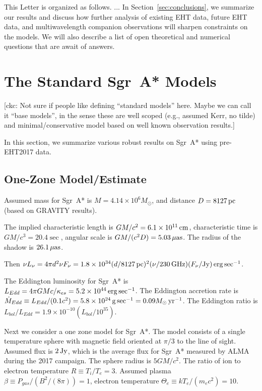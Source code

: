 \documentclass[twocolumn,tighten,dvipsnames]{aastex63}
\newcommand\sgra{Sgr~A*\xspace}
\newcommand\mbh{{M}} %
\newcommand\msun{{M_\odot}}
\newcommand\yr{{\rm \, yr}}
\newcommand\erg{{\rm \, erg}}
\newcommand\Jy{{\rm \, Jy}}
\newcommand\cm{{\rm \, cm}}
\newcommand\pc{{\rm \, pc}}
\newcommand\gm{{\rm \, g}}
\newcommand\uas{{\rm \, \mu as}}
\newcommand\GHz{{\rm \, GHz}}
\newcommand\<{{\langle}}
\renewcommand\>{{\rangle}} %
\newcommand\ckc[1]{{\color{MidnightBlue}[ckc: #1]}}
\begin{document}
This Letter is organized as follows.
...
In Section~\ref{sec:conclusions}, we summarize our results and discuss
how further analysis of existing EHT data, future EHT data, and
multiwavelength companion observations will sharpen constraints on the
models.
We will also describe a list of open theoretical and numerical
questions that are await of answers.

\section{The Standard \sgra Models}
\label{sec:basemodels}

\ckc{Not sure if people like defining ``standard models'' here.
  Maybe we can call it ``base models'', in the sense these are well
  scoped (e.g., assumed Kerr, no tilde) and minimal/conservative
  model based on well known observation results.}

In this section, we summarize various robust results on \sgra using
pre-EHT2017 data.

\subsection{One-Zone Model/Estimate}

Assumed mass for \sgra is $\mbh = 4.14 \times 10^6 \msun$, and
distance $D = 8127\pc$ (based on GRAVITY results).

The implied characteristic length is $G\mbh/c^2 = 6.1 \times 10^{11}
\cm$, characteristic time is $G\mbh/c^3 = 20.4 \sec$, angular scale is
$G\mbh/(c^2 D) = 5.03\uas$.
The radius of the shadow is $26.1\uas$.

Then $\nu L_\nu = 4 \pi d^2 \nu F_\nu = 1.8 \times 10^{34} (d/8127
\pc)^2 (\nu/230 \GHz)(F_\nu/{\rm Jy}) \erg \sec^{-1}$.

The Eddington luminosity for \sgra is $L_{Edd} = 4\pi G\mbh
c/\kappa_{es} = 5.2 \times 10^{44} \erg\sec^{-1}$. The Eddington
accretion rate is $\dot\mbh_{Edd} \equiv L_{Edd}/(0.1 c^2) = 5.8
\times 10^{24} \gm \sec^{-1} = 0.09 \msun \yr^{-1}$.
The Eddington ratio is $L_{bol}/L_{Edd} = 1.9 \times 10^{-10}
(L_{bol}/10^{35})$.

Next we consider a one zone model for \sgra.
The model consists of a single temperature sphere with magnetic field
oriented at $\pi/3$ to the line of sight.
Assumed flux is $2\Jy$, which is the average flux for \sgra measured
by ALMA during the 2017 campaign.
The sphere radius is $5 G\mbh/c^2$.
The ratio of ion to electron temperature $R \equiv T_i/T_e = 3$.
Assumed plasma $\beta \equiv P_{gas}/(B^2/(8\pi)) = 1$, electron
temperature $\Theta_e \equiv k T_e/(m_e c^2) = 10$.
\end{document}
